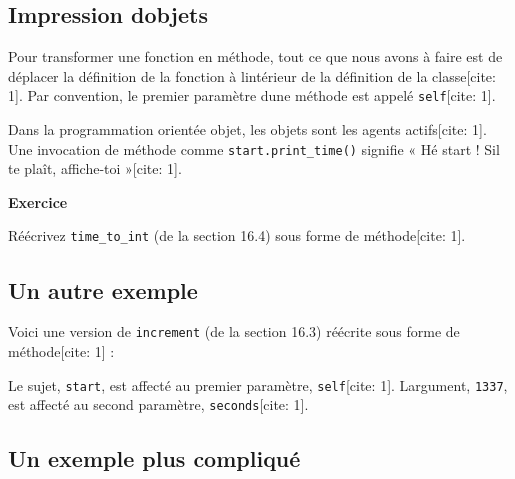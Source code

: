 \hypertarget{impression-dobjets}{%
\subsection{Impression
d\textquotesingle objets}\label{impression-dobjets}}

Pour transformer une fonction en méthode, tout ce que nous avons à faire
est de déplacer la définition de la fonction à
l\textquotesingle intérieur de la définition de la classe{[}cite: 1{]}.
Par convention, le premier paramètre d\textquotesingle une méthode est
appelé \texttt{self}{[}cite: 1{]}.

Dans la programmation orientée objet, les objets sont les agents
actifs{[}cite: 1{]}. Une invocation de méthode comme
\texttt{start.print\_time()} signifie « Hé start ! S\textquotesingle il
te plaît, affiche-toi »{[}cite: 1{]}.

\textbf{Exercice}

Réécrivez \texttt{time\_to\_int} (de la section 16.4) sous forme de
méthode{[}cite: 1{]}.

\hypertarget{un-autre-exemple}{%
\subsection{Un autre exemple}\label{un-autre-exemple}}

Voici une version de \texttt{increment} (de la section 16.3) réécrite
sous forme de méthode{[}cite: 1{]} :

\begin{Shaded}
\begin{Highlighting}[]

\OperatorTok{+=} 
\end{Highlighting}
\end{Shaded}

Le sujet, \texttt{start}, est affecté au premier paramètre,
\texttt{self}{[}cite: 1{]}. L\textquotesingle argument, \texttt{1337},
est affecté au second paramètre, \texttt{seconds}{[}cite: 1{]}.

\hypertarget{un-exemple-plus-compliquuxe9}{%
\subsection{Un exemple plus
compliqué}\label{un-exemple-plus-compliquuxe9}}

